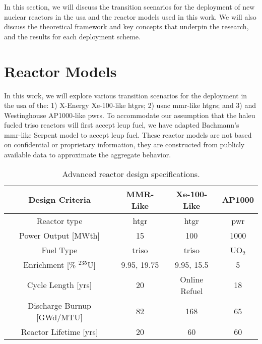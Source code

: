 In this section, we will discuss the transition scenarios for the deployment of new nuclear reactors in the \gls{usa} and the reactor models used in this work. We will also discuss the theoretical framework and key concepts that underpin the research, and the results for each deployment scheme.

\section{Reactor Models}
\label{sec:reactor_models}

In this work, we will explore various transition scenarios for the deployment in the \gls{usa} of the: 1) X-Energy Xe-100-like \glspl{htgr}; 2) \gls{usnc} \gls{mmr}-like \glspl{htgr}; and 3) and Westinghouse AP1000-like \glspl{pwr}. To accommodate our assumption that the \gls{haleu} fueled \gls{triso} reactors will first accept \gls{leup} fuel, we have adapted Bachmann's \gls{mmr}-like Serpent model \cite{bachmann_mmr_like_2023} to accept \gls{leup} fuel. These reactor models are not based on confidential or proprietary information, they are constructed from publicly available data to approximate the aggregate behavior.

\begin{table}[htbp]
   \centering
   \caption{Advanced reactor design specifications.}
   \label{tab:ar_defs}
   \begin{tabular}{c c c c}
      \hline
      \textbf{Design Criteria} & \textbf{MMR-Like} \cite{usnc_design_2021} & \textbf{Xe-100-Like} \cite{nuscale_chapter_2018} & \textbf{AP1000} \\
      \hline
      Reactor type & \gls{htgr} & \gls{htgr} & \gls{pwr} \\
      Power Output [MWth] & 15 & 100 & 1000 \\
      Fuel Type & \gls{triso} & \gls{triso} & UO$_2$ \\
      Enrichment [\% $^{235}$U] & 9.95, 19.75 & 9.95, 15.5 & 5 \\
      Cycle Length [yrs] & 20 & Online Refuel & 18 \\
      Discharge Burnup [GWd/MTU] & 82 & 168 & 65 \\
      Reactor Lifetime [yrs] & 20 & 60 & 60 \\
      \hline
   \end{tabular}
\end{table}

